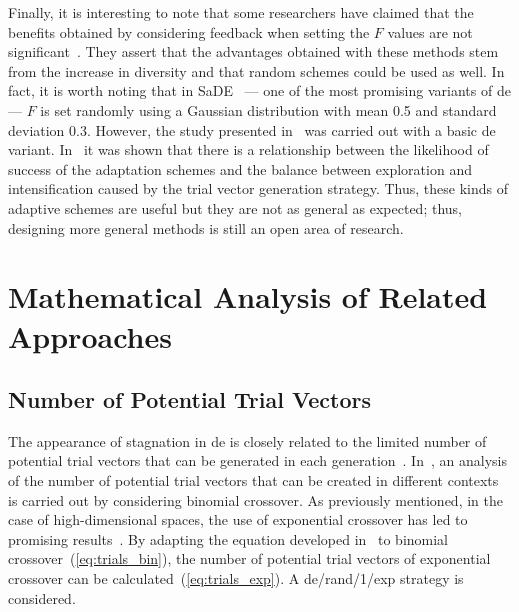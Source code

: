 \documentclass[review,3p]{elsarticle}
\newcommand{\DE}{{\sc de}}
\begin{document}
Finally, it is interesting to note that some researchers have claimed that the benefits obtained by considering feedback when
setting the $F$ values are not significant~\cite{Zielinski:08}.
%
They assert that the advantages obtained with these methods stem from the increase in diversity and that random schemes
could be used as well.
%
In fact, it is worth noting that in SaDE~\cite{Qin:09} --- one of the most promising variants of \DE{} ---
$F$ is set randomly using a Gaussian distribution with mean 0.5 and standard deviation 0.3.
%
However, the study presented in~\cite{Zielinski:08} was carried out with a basic \DE{} variant.
%
In~\cite{Segura:14} it was shown that there is a relationship between the likelihood of success of the adaptation schemes and
the balance between exploration and intensification caused by the trial vector generation strategy.
%
Thus, these kinds of adaptive schemes are useful but they are not as general as expected;
thus, designing more general methods is still an open area of research.

%

\section{Mathematical Analysis of Related Approaches}
\label{sec:motivations}

\subsection{Number of Potential Trial Vectors}

The appearance of stagnation in \DE{} is closely related to the limited number of potential trial
vectors that can be generated in each generation~\cite{Lampinen:00,Langdon:07}.
%
In~\cite{Lampinen:00}, an analysis of the number of potential trial vectors that can be created
in different contexts is carried out by considering binomial crossover.
%
As previously mentioned, in the case of high-dimensional spaces, the use of exponential crossover has led to
promising results~\cite{LaTorre:11}.
%
By adapting the equation developed in~\cite{Lampinen:00} to binomial crossover~(\ref{eq:trials_bin}),
the number of potential trial vectors of exponential crossover can be calculated~(\ref{eq:trials_exp}).
%
A \DE{}/rand/1/exp strategy is considered.
\end{document}
